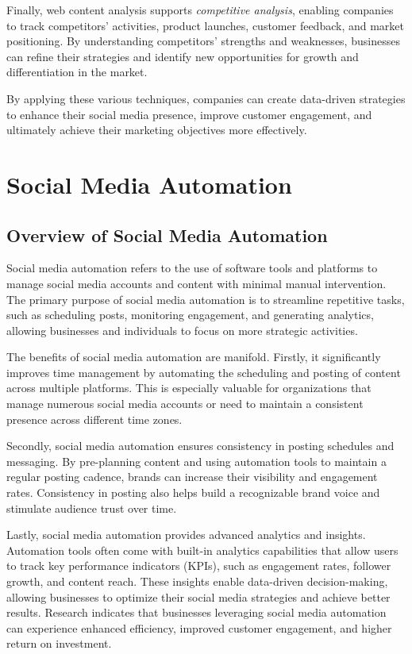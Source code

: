 Finally, web content analysis supports \textit{competitive analysis}, enabling companies to track competitors' activities, product launches, customer feedback, and market positioning.
By understanding competitors' strengths and weaknesses, businesses can refine their strategies and identify new opportunities for growth and differentiation in the market.

By applying these various techniques, companies can create data-driven strategies to enhance their social media presence, improve customer engagement, and ultimately achieve their marketing objectives more effectively.


\section{Social Media Automation}
\label{sec:social_media_automation}

\subsection{Overview of Social Media Automation}
\label{subsec:overview_of_social_media_automation}
Social media automation refers to the use of software tools and platforms to manage social media accounts and content with minimal manual intervention.
The primary purpose of social media automation is to streamline repetitive tasks, such as scheduling posts, monitoring engagement, and generating analytics, allowing businesses and individuals to focus on more strategic activities.

The benefits of social media automation are manifold.
Firstly, it significantly improves time management by automating the scheduling and posting of content across multiple platforms.
This is especially valuable for organizations that manage numerous social media accounts or need to maintain a consistent presence across different time zones.

Secondly, social media automation ensures consistency in posting schedules and messaging.
By pre-planning content and using automation tools to maintain a regular posting cadence, brands can increase their visibility and engagement rates.
Consistency in posting also helps build a recognizable brand voice and stimulate audience trust over time.

Lastly, social media automation provides advanced analytics and insights.
Automation tools often come with built-in analytics capabilities that allow users to track key performance indicators (KPIs), such as engagement rates, follower growth, and content reach.
These insights enable data-driven decision-making, allowing businesses to optimize their social media strategies and achieve better results.
Research indicates that businesses leveraging social media automation can experience enhanced efficiency, improved customer engagement, and higher return on investment\cite{can_you_measure_the_roi_of_your_social_media_marketing}.

